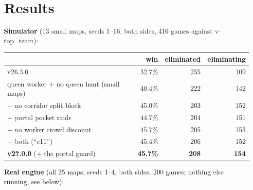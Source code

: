 \documentclass[11pt,a4paper]{article}
\begin{document}
\section{Results}\label{sec:v27results}
\textbf{Simulator} (13 small maps, seeds 1--16, both sides, 416 games against v-top\_team):
\begin{center}
      \begin{tabular}{lrrr}
                                                      & win             & eliminated   & eliminating  \\ \hline
            v26.3.0                                   & 32.7\%          & 255          & 109          \\
            queen worker + no queen hunt (small maps) & 40.4\%          & 222          & 142          \\
            \quad + no corridor split block           & 45.0\%          & 203          & 152          \\
            \quad + portal pocket raids               & 44.7\%          & 204          & 151          \\
            \quad + no worker crowd discount          & 45.7\%          & 205          & 153          \\
            \quad + both (``c11'')                    & 45.4\%          & 206          & 152          \\
            \textbf{v27.0.0} (+ the portal guard)     & \textbf{45.7\%} & \textbf{208} & \textbf{154} \\
      \end{tabular}
\end{center}
\textbf{Real engine} (all 25 maps, seeds 1--4, both sides, 200 games; nothing else running, see below):
\end{document}
